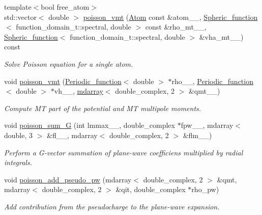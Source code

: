 \begin{DoxyCompactItemize}
\item 
{\footnotesize template$<$bool free\+\_\+atom$>$ }\\std\+::vector$<$ double $>$ \hyperlink{classsirius_1_1_potential_a1df196fb2d0109666c57be81b7d39197}{poisson\+\_\+vmt} (\hyperlink{classsirius_1_1_atom}{Atom} const \&atom\+\_\+\+\_\+, \hyperlink{classsirius_1_1_spheric__function}{Spheric\+\_\+function}$<$ function\+\_\+domain\+\_\+t\+::spectral, double $>$ const \&rho\+\_\+mt\+\_\+\+\_\+, \hyperlink{classsirius_1_1_spheric__function}{Spheric\+\_\+function}$<$ function\+\_\+domain\+\_\+t\+::spectral, double $>$ \&vha\+\_\+mt\+\_\+\+\_\+) const 
\begin{DoxyCompactList}\small\item\em Solve Poisson equation for a single atom. \end{DoxyCompactList}\item 
void \hyperlink{classsirius_1_1_potential_a1c8a0fb353b7544f6f114417a8627586}{poisson\+\_\+vmt} (\hyperlink{classsirius_1_1_periodic__function}{Periodic\+\_\+function}$<$ double $>$ $\ast$rho\+\_\+\+\_\+, \hyperlink{classsirius_1_1_periodic__function}{Periodic\+\_\+function}$<$ double $>$ $\ast$vh\+\_\+\+\_\+, \hyperlink{classsddk_1_1mdarray}{mdarray}$<$ double\+\_\+complex, 2 $>$ \&qmt\+\_\+\+\_\+)
\begin{DoxyCompactList}\small\item\em Compute M\+T part of the potential and M\+T multipole moments. \end{DoxyCompactList}\item 
void \hyperlink{classsirius_1_1_potential_a50dd31a86f55c9fee5b7264397bcb586}{poisson\+\_\+sum\+\_\+\+G} (int lmmax\+\_\+\+\_\+, double\+\_\+complex $\ast$fpw\+\_\+\+\_\+, mdarray$<$ double, 3 $>$ \&fl\+\_\+\+\_\+, mdarray$<$ double\+\_\+complex, 2 $>$ \&flm\+\_\+\+\_\+)
\begin{DoxyCompactList}\small\item\em Perform a G-\/vector summation of plane-\/wave coefficiens multiplied by radial integrals. \end{DoxyCompactList}\item 
void \hyperlink{classsirius_1_1_potential_ac1e5381fc52a6d366849c48daf4fdc32}{poisson\+\_\+add\+\_\+pseudo\+\_\+pw} (mdarray$<$ double\+\_\+complex, 2 $>$ \&qmt, mdarray$<$ double\+\_\+complex, 2 $>$ \&qit, double\+\_\+complex $\ast$rho\+\_\+pw)
\begin{DoxyCompactList}\small\item\em Add contribution from the pseudocharge to the plane-\/wave expansion. \end{DoxyCompactList}\item 

\end{DoxyCompactItemize}
